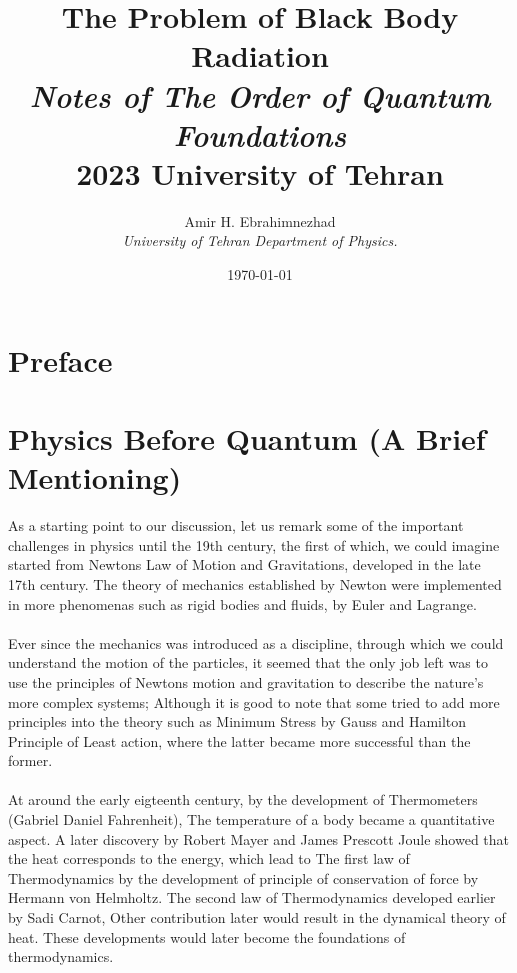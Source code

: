 \documentclass[9pt,a4paper, twocolumn]{article}
\title{The Problem of Black Body Radiation \\ \large \textit{Notes of The Order of Quantum Foundations} \\ 2023 University of Tehran}
\date{\today}
\author{Amir H. Ebrahimnezhad \\ \small \textit{University of Tehran Department of Physics.}}
\newcounter{theo}
\begin{document}
    \maketitle
    \section*{Preface}
    \section{Physics Before Quantum (A Brief Mentioning)}
        As a starting point to our discussion, let us remark some of the important challenges in physics until the 19th century, the first of which, we could imagine started from Newtons Law of Motion and Gravitations, developed in the late 17th century. The theory of mechanics established by Newton were implemented in more phenomenas such as rigid bodies and fluids, by Euler and Lagrange.
        \\
        \\
        Ever since the mechanics was introduced as a discipline, through which we could understand the motion of the particles, it seemed that the only job left was to use the principles of Newtons motion and gravitation to describe the nature's more complex systems; Although it is good to note that some tried to add more principles into the theory such as Minimum Stress by Gauss and Hamilton Principle of Least action, where the latter became more successful than the former.
        \\
        \\
        At around the early eigteenth century, by the development of Thermometers (Gabriel Daniel Fahrenheit), The temperature of a body became a quantitative aspect. A later discovery by Robert Mayer and James Prescott Joule showed that the heat corresponds to the energy, which lead to The first law of Thermodynamics by the development of principle of conservation of force by Hermann von Helmholtz. The second law of Thermodynamics developed earlier by Sadi Carnot, Other contribution later would result in the dynamical theory of heat. These developments would later become the foundations of thermodynamics.
        \\
        \\
\end{document}
